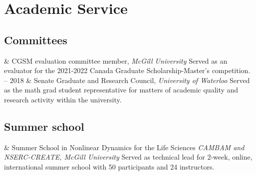 \documentclass[11pt, a4paper]{article}
\newcommand{\Duration}[2]{\fontsize{10pt}{0}\selectfont #1 -- #2}
\newcommand{\Year}[1]{\fontsize{10pt}{0}\selectfont #1}
\newcommand{\Ongoing}{present}
\begin{document}
\section{Academic Service}
%
%
%
%

\subsection{Committees}

\begin{EntriesTable}

\Year{2021} &
  CGSM evaluation committee member, \emph{McGill University}\newline
  Served as an evaluator for the 2021-2022 Canada Graduate Scholarship-Master’s competition.
  \\

\Duration{2017}{2018} &
  Senate Graduate and Research Council, \emph{University of Waterloo}\newline
  Served as the math grad student representative for matters of academic quality and research activity within the university.
  \\
\end{EntriesTable}


\subsection{Summer school}
\begin{EntriesTable}
  \Year{2021} & 
  Summer School in Nonlinear Dynamics for the Life Sciences\newline
  \emph{CAMBAM and NSERC-CREATE, McGill University}\newline
  Served as technical lead for 2-week, online, international summer school with 50 participants and 24 instructors.
  \\
\end{EntriesTable}
\end{document}
